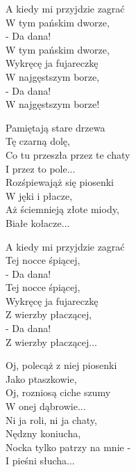 \begin{text}
    A kiedy mi przyjdzie zagrać\\
    W tym pańskim dworze,\\
    - Da dana!\\
    W tym pańskim dworze,\\
    Wykręcę ja fujareczkę\\
    W najgęstszym borze,\\
    - Da dana!\\
    W najgęstszym borze!

    Pamiętają stare drzewa\\
    Tę czarną dolę,\\
    Co tu przeszła przez te chaty\\
    I przez to pole...\\
    Rozśpiewająż się piosenki\\
    W jęki i płacze,\\
    Aż ściemnieją złote miody,\\
    Białe kołacze...

A kiedy mi przyjdzie zagrać\\
Tej nocce śpiącej,\\
- Da dana!\\
Tej nocce śpiącej,\\
Wykręcę ja fujareczkę\\
Z wierzby płaczącej,\\
- Da dana!\\
Z wierzby płaczącej...

Oj, polecąż z niej piosenki\\
Jako ptaszkowie,\\
Oj, rozniosą ciche szumy\\
W onej dąbrowie...\\
Ni ja roli, ni ja chaty,\\
Nędzny koniucha,\\
Nocka tylko patrzy na mnie -\\
I pieśni słucha...
\end{text}
